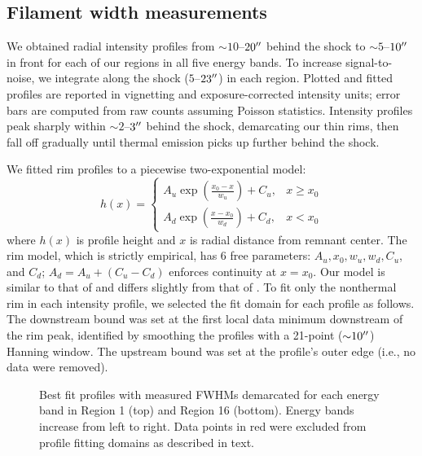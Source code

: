 \documentclass[iop, apj, numberedappendix, twocolappendix]{emulateapj}
\newcommand*{\abt}{\mathord{\sim}} %
\begin{document}
\subsection{Filament width measurements}
\label{sec:fwhms}

We obtained radial intensity profiles from $\abt 10$--$20\mbox{$^{\prime\prime}$}$ behind the
shock to $\abt 5$--$10\mbox{$^{\prime\prime}$}$ in front for each of our regions in all five
energy bands.  To increase signal-to-noise, we integrate along the shock
($5$--$23\mbox{$^{\prime\prime}$}$) in each region.  Plotted and fitted profiles are reported in
vignetting and exposure-corrected intensity units; error bars are computed from
raw counts assuming Poisson statistics.  Intensity profiles peak sharply
within $\abt 2$--$3\mbox{$^{\prime\prime}$}$ behind the shock, demarcating our thin rims,
then fall off gradually until thermal emission picks up further behind the
shock.

We fitted rim profiles to a piecewise two-exponential model:
\begin{equation} \label{eq:prof}
    h(x) =
    \begin{cases}
        A_u \exp \left(\frac{x_0 - x}{w_u}\right) + C_u, &x \geq x_0 \\
        A_d \exp \left(\frac{x - x_0}{w_d}\right) + C_d, &x < x_0
    \end{cases}
\end{equation}
where $h(x)$ is profile height and $x$ is radial distance from remnant center.
The rim model, which is strictly empirical, has 6 free parameters:
$A_u, x_0, w_u, w_d, C_u$, and $C_d$; $A_d = A_u + (C_u - C_d)$ enforces
continuity at $x=x_0$. Our model is similar to that of \citet{bamba2003,
bamba2005-hist} and differs slightly from that of .
To fit only the nonthermal rim in each intensity profile, we selected the fit
domain for each profile as follows.  The downstream bound was set at the first
local data minimum downstream of the rim peak, identified by smoothing the
profiles with a 21-point ($\abt 10\arcsec$) Hanning window.  The upstream bound
was set at the profile's outer edge (i.e., no data were removed).

\begin{figure*}[ht]
    \caption{Best fit profiles with measured FWHMs demarcated for each energy
        band in Region 1 (top) and Region 16 (bottom).  Energy bands increase
        from left to right.  Data points in red were excluded from profile
        fitting domains as described in text.}
    \label{fig:profiles}
\end{figure*}
\end{document}
